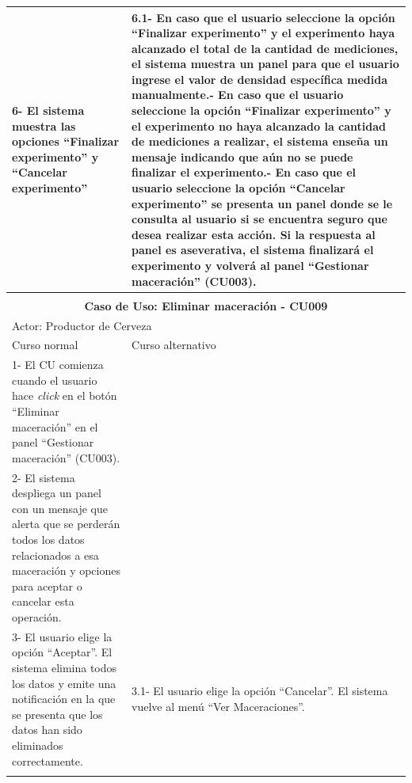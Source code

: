 \begin{longtable}{|p{7cm}|p{7cm}|}
        6- El sistema muestra las opciones ``Finalizar experimento'' y ``Cancelar experimento'' & 6.1- En caso que el usuario seleccione la opción ``Finalizar experimento'' y el experimento haya alcanzado el total de la cantidad de mediciones, el sistema muestra un panel para que el usuario ingrese el valor de densidad específica medida manualmente.\newline 6.2- En caso que el usuario seleccione la opción ``Finalizar experimento'' y el experimento no haya alcanzado la cantidad de mediciones a realizar, el sistema enseña un mensaje indicando que aún no se puede finalizar el experimento.\newline 
        6.3- En caso que el usuario seleccione la opción ``Cancelar experimento'' se presenta un panel donde se le consulta al usuario si se encuentra seguro que desea realizar esta acción. Si la respuesta al panel es aseverativa, el sistema finalizará el experimento y volverá al panel ``Gestionar maceración'' (CU003).\\
        \hline
       \multicolumn{2}{c}{ }\\
        \hline
        
        \multicolumn{2}{|c|}{\textbf{Caso de Uso: Eliminar maceración - CU009}} \\
        \hline
        \multicolumn{2}{|l|}{Actor: Productor de Cerveza} \\
        \hline
        Curso normal & Curso alternativo \\
        \hline
        1- El CU comienza cuando el usuario hace \textit{click} en el botón ``Eliminar maceración'' en el panel ``Gestionar maceración'' (CU003). & \\
        \hline
        2- El sistema despliega un panel con un mensaje que alerta que se perderán todos los datos relacionados a esa maceración y opciones para aceptar o cancelar esta operación. &
        \\
        \hline
        3- El usuario elige la opción ``Aceptar''. El sistema elimina todos los datos y emite una notificación en la que se presenta que los datos han sido eliminados correctamente. & 3.1- El usuario elige la opción ``Cancelar''. El sistema vuelve al menú ``Ver Maceraciones''.
        \\
        \hline
        \multicolumn{2}{c}{ }\\
        

\end{longtable}
